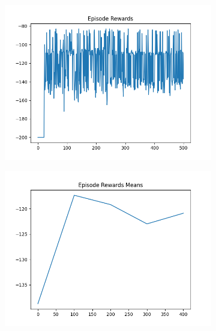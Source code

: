 \begin{figure}[H]
    \centering
    \begin{subfigure}{.47\linewidth}
        \centering
        \includegraphics[width=\textwidth]{mountain/2024-06-15_13-02-52_dqn_mountaincar_episode_rewards.png}
    \end{subfigure}
    \begin{subfigure}{.47\linewidth}
        \centering
        \includegraphics[width=\textwidth]{mountain/2024-06-15_13-02-52_dqn_mountaincar_episode_rewards_means.png}
    \end{subfigure}
    \begin{subfigure}{.47\linewidth}
        \centering

\end{subfigure}
\end{figure}
